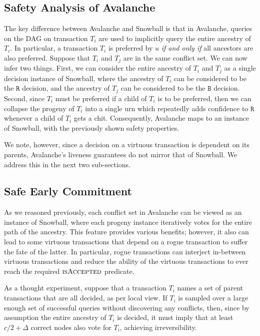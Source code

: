 \documentclass[letterpaper,twocolumn,10pt]{article}
\newcommand{\tronly}[2]{#1}
\theoremstyle{definition}
\begin{document}
\begin{appendices}
\subsection{Safety Analysis of Avalanche}\tronly{}{\vspace{-0.5em}}
The key difference between Avalanche and Snowball is that in Avalanche, queries on the DAG on transaction $T_i$ are used to implicitly query the entire ancestry of $T_i$.
In particular, a transaction $T_i$ is preferred by $u$ \textit{if and only if} all ancestors are also preferred.
Suppose that $T_i$ and $T_j$ are in the same conflict set.
We can now infer two things.
First, we can consider the entire ancestry of $T_i$ and $T_j$ as a single decision instance of Snowball, where the ancestry of $T_i$ can be considered to be the $\mathtt{R}$ decision, and the ancestry of $T_j$ can be considered to be the $\mathtt{B}$ decision.
Second, since $T_i$ must be preferred if a child of $T_i$ is to be preferred, then we can collapse the progeny of $T_i$ into a single urn which repeatedly adds confidence to $\mathtt{R}$ whenever a child of $T_i$ gets a chit.
Consequently, Avalanche maps to an instance of Snowball, with the previously shown safety properties.

We note, however, since a decision on a virtuous transaction is dependent on its parents, Avalanche's liveness guarantees do not mirror that of Snowball. We address this in the next two sub-sections.

\subsection{Safe Early Commitment}\tronly{}{\vspace{-0.5em}}
\tronly{
As we reasoned previously, each conflict set in Avalanche can be viewed as an instance of Snowball, where each progeny instance iteratively votes for the entire path of the ancestry.
This feature provides various benefits; however, it also can lead to some virtuous transactions that depend on a rogue transaction to suffer the fate of the latter.
In particular, rogue transactions can interject in-between virtuous transactions and reduce the ability of the virtuous transactions to ever reach the required $\textsc{isAccepted}$ predicate.
}{}
As a thought experiment, suppose that a transaction $T_i$ names a set of parent transactions that are all decided, as per local view.
If $T_i$ is sampled over a large enough set of successful queries without discovering any conflicts, then, since by assumption the entire ancestry of $T_i$ is decided, it must imply that at least $c/2 + \Delta$ correct nodes also vote for $T_i$, achieving irreversibility.


\end{appendices}
\end{document}
